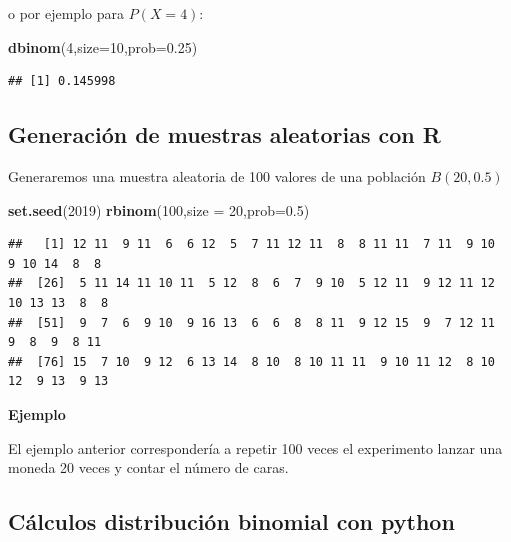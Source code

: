 \documentclass[]{book}
\newenvironment{Shaded}{\begin{snugshade}}{\end{snugshade}}
\newcommand{\DataTypeTok}[1]{\textcolor[rgb]{0.13,0.29,0.53}{#1}}
\newcommand{\DecValTok}[1]{\textcolor[rgb]{0.00,0.00,0.81}{#1}}
\newcommand{\FloatTok}[1]{\textcolor[rgb]{0.00,0.00,0.81}{#1}}
\newcommand{\KeywordTok}[1]{\textcolor[rgb]{0.13,0.29,0.53}{\textbf{#1}}}
\newcommand{\NormalTok}[1]{#1}
\begin{document}
o por ejemplo para \(P(X=4)\):

\begin{Shaded}
\begin{Highlighting}[]
\KeywordTok{dbinom}\NormalTok{(}\DecValTok{4}\NormalTok{,}\DataTypeTok{size=}\DecValTok{10}\NormalTok{,}\DataTypeTok{prob=}\FloatTok{0.25}\NormalTok{)}
\end{Highlighting}
\end{Shaded}

\begin{verbatim}
## [1] 0.145998
\end{verbatim}

\hypertarget{generaciuxf3n-de-muestras-aleatorias-con-r}{%
\subsection{Generación de muestras aleatorias con R}\label{generaciuxf3n-de-muestras-aleatorias-con-r}}

Generaremos una muestra aleatoria de 100 valores de una población \(B(20,0.5)\)

\begin{Shaded}
\begin{Highlighting}[]
\KeywordTok{set.seed}\NormalTok{(}\DecValTok{2019}\NormalTok{)}
\KeywordTok{rbinom}\NormalTok{(}\DecValTok{100}\NormalTok{,}\DataTypeTok{size =} \DecValTok{20}\NormalTok{,}\DataTypeTok{prob=}\FloatTok{0.5}\NormalTok{)}
\end{Highlighting}
\end{Shaded}

\begin{verbatim}
##   [1] 12 11  9 11  6  6 12  5  7 11 12 11  8  8 11 11  7 11  9 10  9 10 14  8  8
##  [26]  5 11 14 11 10 11  5 12  8  6  7  9 10  5 12 11  9 12 11 12 10 13 13  8  8
##  [51]  9  7  6  9 10  9 16 13  6  6  8  8 11  9 12 15  9  7 12 11  9  8  9  8 11
##  [76] 15  7 10  9 12  6 13 14  8 10  8 10 11 11  9 10 11 12  8 10 12  9 13  9 13
\end{verbatim}

\textbf{Ejemplo}

El ejemplo anterior correspondería a repetir 100 veces el experimento lanzar una moneda 20 veces y contar el número de caras.

\hypertarget{cuxe1lculos-distribuciuxf3n-binomial-con-python}{%
\subsection{Cálculos distribución binomial con python}\label{cuxe1lculos-distribuciuxf3n-binomial-con-python}}
\end{document}
